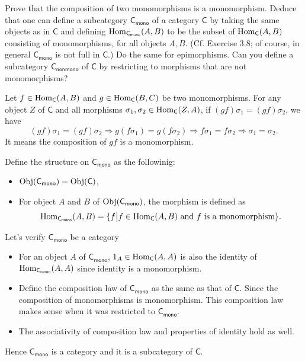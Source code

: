 \begin{problem}[4.4]
  Prove that the composition of two monomorphisms is a monomorphism. Deduce that
  one can define a subcategory $\mathsf{C}_\mathsf{mono}$ of a category $\mathsf{C}$ by taking the same
  objects as in $\mathsf{C}$ and defining $\mathrm{Hom}_{\mathsf{C}_\mathsf{mono}}(A, B)$ to be the subset of
  $\mathrm{Hom}_\mathsf{C}(A, B)$ consisting of monomorphisms, for all objects $A, B$. (Cf.
  Exercise 3.8; of course, in general $\mathsf{C}_\mathsf{mono}$ is not full in $\mathsf{C}$.) Do the same
  for epimorphisms. Can you define a subcategory $\mathsf{C}_\mathsf{nonmono}$ of $\mathsf{C}$ by
  restricting to morphisms that are not monomorphisms?
\end{problem}

\begin{solution}
Let $f\in \mathrm{Hom}_{\mathsf{C}}(A, B)$ and $g\in \mathrm{Hom}_{\mathsf{C}}(B, C)$ be two monomorphisms. 
For any object $Z$ of $\mathsf{C}$ and all morphisms $\sigma_1,\sigma_2\in \mathrm{Hom}_{\mathsf{C}}(Z, A)$, 
if $(gf)\sigma_1 = (gf)\sigma_2$, we have
$$(gf)\sigma_1 = (gf)\sigma_2\Longrightarrow g(f\sigma_1)=g(f\sigma_2) \Longrightarrow f\sigma_1=f\sigma_2\Longrightarrow \sigma_1 = \sigma_2.$$  
It means the composition of $gf$ is a monomorphism.

Define the structure on $\mathsf{C}_\mathsf{mono}$ as the followinig:
\begin{itemize}
    \item $\mathrm{Obj}(\mathsf{C}_\mathsf{mono})=\mathrm{Obj}(\mathsf{C})$,
    \item For object $A$ and $B$ of $\mathrm{Obj}(\mathsf{C}_\mathsf{mono})$, the morphism is defined as
    $$\mathrm{Hom}_{\mathsf{C}_\mathsf{mono}}(A,B) = \{f\big{|} f\in \mathrm{Hom}_{\mathsf{C}}(A,B) \text{ and } f \text{ is a monomorphism}\}.$$
\end{itemize}
Let's verify $\mathsf{C}_\mathsf{mono}$ be a category
\begin{itemize}
    \item For an object $A$ of $\mathsf{C}_\mathsf{mono}$, $1_A\in \mathrm{Hom}_{\mathsf{C}}(A,A)$ is also the identity of $\mathrm{Hom}_{\mathsf{C}_\mathsf{mono}}(A,A)$ since identity is a monomorphism.
    \item Define the composition law of $\mathsf{C}_\mathsf{mono}$ as the same as that of $\mathsf{C}$. 
    Since the composition of monomorphisms is monomorphism. This composition law makes sense when it was restricted to $\mathsf{C}_\mathsf{mono}$.
    \item The associativity of composition law and properties of identity hold as well.
\end{itemize}
Hence $\mathsf{C}_\mathsf{mono}$ is a category and it is a subcategory of $\mathsf{C}$.


\end{solution}
